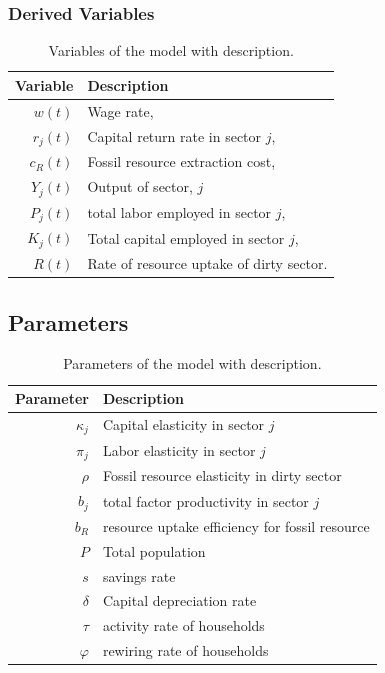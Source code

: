 \subsubsection{Derived Variables}

\begin{table}[H]
	\centering
	\begin{tabular}{r|l}
		Variable & Description \\\hline
		$w(t)$   & Wage rate, \\
		$r_j(t)$ & Capital return rate in sector $j$, \\
		$c_R(t)$ & Fossil resource extraction cost, \\
		$Y_j(t)$ & Output of sector, $j$ \\
		$P_j(t)$ & total labor employed in sector $j$, \\
		$K_j(t)$ & Total capital employed in sector $j$, \\
		$R(t)$ & Rate of resource uptake of dirty sector. \\
	\end{tabular}
	\caption{Variables of the model with description.}
	\label{tab:derived_variables}
 \end{table}

\subsection{Parameters}

\begin{table}[H]
	\centering
	\begin{tabular}{r|l}
		Parameter & Description \\\hline
		$\kappa_j$ & Capital elasticity in sector $j$ \\
		$\pi_j$ & Labor elasticity in sector $j$ \\
		$\rho$ & Fossil resource elasticity in dirty sector \\
		$b_j$ & total factor productivity in sector $j$ \\
		$b_R$ & resource uptake efficiency for fossil resource \\
		$P$ & Total population \\
		$s$ & savings rate \\
		$\delta $ & Capital depreciation rate \\
		$\tau$ & activity rate of households \\
		$\varphi$ & rewiring rate of households
	\end{tabular}
	\caption{Parameters of the model with description.}
	\label{tab:parameters}
\end{table}
 
